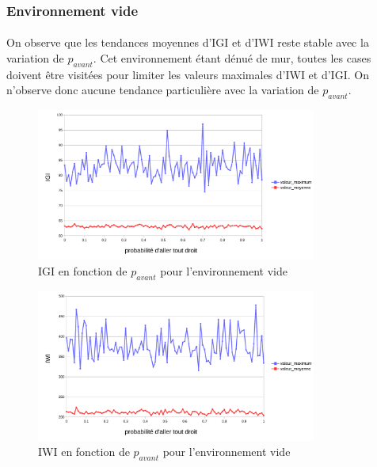 \documentclass{article}
\begin{document}
    \subsubsection{Environnement vide}
    \paragraph{}On observe que les tendances moyennes d'IGI et d'IWI reste stable avec la variation de $p_{avant}$. Cet environnement étant dénué de mur, toutes les cases doivent être visitées pour limiter les valeurs maximales d'IWI et d'IGI.
    On n'observe donc aucune tendance particulière avec la variation de $p_{avant}$.
    \begin{figure}[!h]
        \begin{center}
            \includegraphics[width = 0.82\textwidth]{graphes pdf/variance go-ahead IGI.pdf}
            \caption{IGI en fonction de $p_{avant}$ pour l'environnement vide}
        \end{center}
    \end{figure}
    \begin{figure}[!h]
        \begin{center}
            \includegraphics[width = 0.82\textwidth]{graphes pdf/variance go-ahead IWI.pdf}
            \caption{IWI en fonction de $p_{avant}$ pour l'environnement vide}
        \end{center}
    \end{figure}
    \newpage
\end{document}
